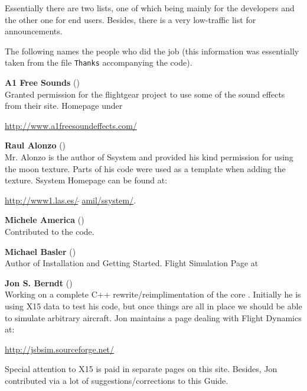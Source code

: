 \noindent
 Essentially there are two lists, one of which being mainly for the developers
and the other one for end users. Besides, there is a very low-traffic list for
announcements.
\medskip

 \noindent
The following names the people who did the job (this information was essentially taken
from the file \texttt{Thanks} accompanying the code).
 \medskip

\noindent \textbf{A1 Free Sounds} ()\\
   Granted permission for the flightgear project to use some of the sound effects from their  
   site. Homepage under   
   \medskip
   
   \href{http://www.a1freesoundeffects.com/}{http://www.a1freesoundeffects.com/}
   \medskip

\noindent \textbf{Raul Alonzo} ()\\
   Mr. Alonzo is the
 author of Ssystem and provided his kind permission for using the moon texture.
 Parts of his code were used as a template when adding the texture.
  Ssystem Homepage can be found at:
   \medskip

  \href{http://www1.las.es/~amil/ssystem/}{http://www1.las.es/$\tilde{~~}$amil/ssystem/}.
 \medskip

 \noindent \textbf{Michele America}
()\\
  Contributed to the  code.
 \medskip

\noindent \textbf{Michael Basler} ()\\
 Author of Installation and Getting Started. Flight Simulation Page at
  \medskip

\medskip

\noindent \textbf{Jon S. Berndt} ()\\
 Working on a complete C++ rewrite/reimplimentation of the core .
  Initially he is using X15 data to test his code, but once things are
  all in place we should be able to simulate arbitrary aircraft. Jon
  maintains a page dealing with Flight Dynamics at:
   \medskip

  \href{http://jsbsim.sourceforge.net/}{http://jsbsim.sourceforge.net/}
   \medskip

\noindent
  Special attention to X15 is paid in separate pages on this site. Besides, Jon
  contributed via a lot of suggestions/corrections to this Guide.
\medskip

